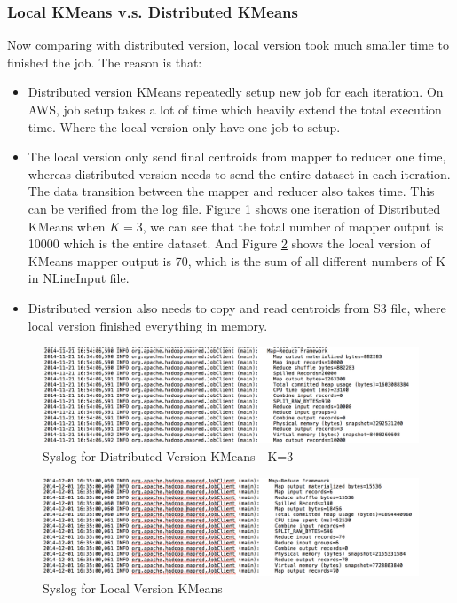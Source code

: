 \documentclass[11pt]{article} %
\begin{document}
\subsubsection{Local KMeans v.s. Distributed KMeans}
Now comparing with distributed version, local version took much smaller time to finished the job. The reason is that:
\begin{itemize}
\item Distributed version KMeans repeatedly setup new job for each iteration. On AWS, job setup takes a lot of time which heavily extend the total execution time. Where the local version only have one job to setup.
\item The local version only send final centroids from mapper to reducer one time, whereas distributed version needs to send the entire dataset in each iteration. The data transition between the mapper and reducer also takes time. This can be verified from the log file. Figure \ref{fig:syslogk3} shows one iteration of Distributed KMeans when $K=3$, we can see that the total number of mapper output is 10000 which is the entire dataset. And Figure \ref{fig:sysloglocal} shows the local version of KMeans mapper output is 70, which is the sum of all different numbers of K in NLineInput file.
\item Distributed version also needs to copy and read centroids from S3 file, where local version finished everything in memory.
\end{itemize}

\begin{figure}[htbp]
\begin{center}
\includegraphics[scale=0.4]{syslogk3.png}
\caption{Syslog for Distributed Version KMeans - K=3}
\label{fig:syslogk3}
\end{center}
\end{figure}

\begin{figure}[htbp]
\begin{center}
\includegraphics[scale=0.4]{sysloglocal.png}
\caption{Syslog for Local Version KMeans}
\label{fig:sysloglocal}
\end{center}
\end{figure}
\end{document}
